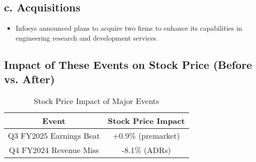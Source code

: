 \documentclass{article}
\begin{document}
\subsection*{c. Acquisitions}
\begin{itemize}
    \item Infosys announced plans to acquire two firms to enhance its capabilities in engineering research and development services. 
\end{itemize}

\subsection{Impact of These Events on Stock Price (Before vs. After)}
\begin{table}[h]
\centering
\begin{tabular}{|c|c|}
\hline
\textbf{Event} & \textbf{Stock Price Impact} \\
\hline
Q3 FY2025 Earnings Beat & +0.9\% (premarket) \\
Q4 FY2024 Revenue Miss & -8.1\% (ADRs) \\
\hline
\end{tabular}
\caption{Stock Price Impact of Major Events}
\end{table}
\end{document}
